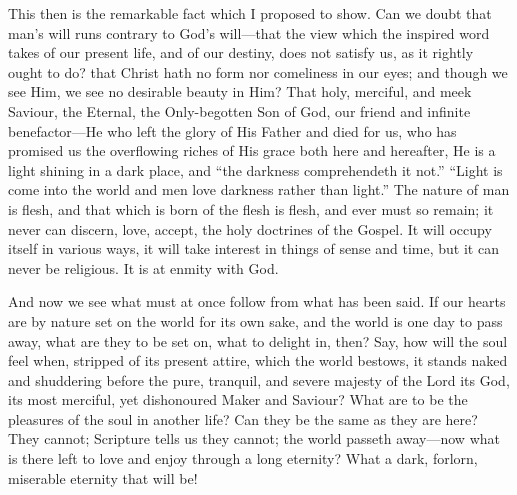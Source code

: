 This then is the remarkable fact which I proposed to show. Can we
doubt that man's will runs contrary to God's will—that the view
which the inspired word takes of our present life, and of our destiny,
does not satisfy us, as it rightly ought to do? that Christ hath no
form nor comeliness in our eyes; and though we see Him, we see no
desirable beauty in Him? That holy, merciful, and meek Saviour, the
Eternal, the Only-begotten Son of God, our friend and infinite
benefactor—He who left the glory of His Father and died for us, who
has promised us the overflowing riches of His grace both here and
hereafter, He is a light shining in a dark place, and ``the
darkness comprehendeth it not.'' ``Light is come into the
world and men love darkness rather than light.'' The nature of man
is flesh, and that which is born of the flesh is flesh, and ever must
so remain; it never can discern, love, accept, the holy doctrines of
the Gospel. It will occupy itself in various ways, it will take
interest in things of sense and time, but it can never be religious.
It is at enmity with God.

And now we see what must at once follow from what has been said. If
our hearts are by nature set on the world for its own sake, and the
world is one day to pass away, what are they to be set on, what to
delight in, then? Say, how will the soul feel when, stripped of its
present attire, which the world bestows, it stands naked and
shuddering before the pure, tranquil, and severe majesty of the Lord
its God, its most merciful, yet dishonoured Maker and Saviour? What
are to be the pleasures of the soul in another life? Can they be the
same as they are here? They cannot; Scripture tells us they cannot;
the world passeth away—now what is there left to love and enjoy
through a long eternity? What a dark, forlorn, miserable eternity that
will be!

